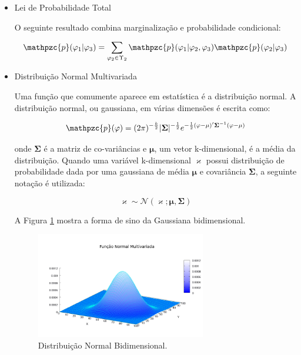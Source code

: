 {\begin{itemize}
\begin{equation}
\mathpzc{p}(\varphi_1) = \sum_{\varphi_2 \in \Upsilon_2} \mathpzc{p}(\varphi_1|\varphi_2)\mathpzc{p}(\varphi_2)
\end{equation}

\item Lei de Probabilidade Total

O seguinte resultado combina marginalização e probabilidade condicional:

\begin{equation}
\mathpzc{p}(\varphi_1|\varphi_3) = \sum_{\varphi_2 \in \Upsilon_2} \mathpzc{p}(\varphi_1|\varphi_2, \varphi_3)\mathpzc{p}(\varphi_2|\varphi_3)
\end{equation}

\item Distribuição Normal Multivariada

Uma função que comumente aparece em estatística é a distribuição normal. A
distribuição normal, ou gaussiana, em várias dimensões é escrita como:

\begin{equation}
\mathpzc{p}(\mathbf{\varphi}) = (2\pi)^{-\frac{k}{2}} | \mathbf{\Sigma} | ^ {-\frac{1}{2}} e^{-\frac{1}{2}(\mathbf{\varphi} - \mathbf{\mu})'\mathbf{\Sigma}^{-1}(\mathbf{\varphi} - \mathbf{\mu})}
\end{equation}

onde $\mathbf{\Sigma}$ é a matriz de co-variâncias e $\mathbf{\mu}$, um vetor
k-dimensional, é a média da distribuição. Quando uma variável k-dimensional
$\mathbf{\varkappa}$ possui distribuição de probabilidade dada por uma gaussiana
de média $\mathbf{\mu}$ e covariância $\mathbf{\Sigma}$, a seguinte notação é
utilizada:

\begin{equation}
\mathbf{\varkappa} \sim \mathcal{N}(\mathbf{\varkappa}; \mathbf{\mu}, \mathbf{\Sigma})
\end{equation}

A Figura \ref{fig:normal} mostra a forma de sino da Gaussiana bidimensional.

\begin{figure}[!htbp]
\centering
\includegraphics[width=0.7\textwidth]{figs/multivariate.png}
\caption{Distribuição Normal Bidimensional.}
\label{fig:normal}
\end{figure}


\end{itemize}}
